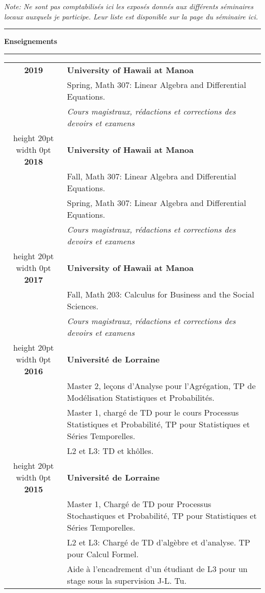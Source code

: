 \documentclass[a4paper,11pt]{article}
\newcommand\espace{\vrule height 20pt width 0pt}
\newcommand{\titre}[1]{%
	\begin{center}
	\bigskip
	\rule{\textwidth}{1pt}
	\par\vspace{0.1cm}
        \textbf{\large #1}
	\par\rule{\textwidth}{1pt}
	\end{center}
	\bigskip
	}
\begin{document}
\vfill
\textit{Note: Ne sont pas comptabilis\'es ici les expos\'es donn\'es aux diff\'erents s\'eminaires locaux auxquels je participe. Leur liste est disponible sur la page du s\'eminaire ici.}
\newpage
\titre{Enseignements}
\begin{tabular}{cp{}}

\textbf{ 2019 } 	& \textbf{University of Hawaii at Manoa}\\
					& Spring, Math 307: Linear Algebra and Differential Equations.\\
					& \textit{Cours magistraux, r\'edactions et corrections des devoirs et examens}\\
\espace
\textbf{ 2018 } 	& \textbf{University of Hawaii at Manoa}\\
					& Fall, Math 307: Linear Algebra and Differential Equations.\\
					& Spring, Math 307: Linear Algebra and Differential Equations.\\
					& \textit{Cours magistraux, r\'edactions et corrections des devoirs et examens}\\
\espace
\textbf{ 2017 } 	& \textbf{University of Hawaii at Manoa}\\
					& Fall, Math 203: Calculus for Business and the Social Sciences.\\
					& \textit{Cours magistraux, r\'edactions et corrections des devoirs et examens}\\
\espace
\textbf{ 2016 } 	& \textbf{Universit\'e de Lorraine}\\
					&	Master 2, le\c{c}ons d'Analyse pour l'Agrégation, TP de Mod\'elisation Statistiques et Probabilit\'es.\\
					&	Master 1,	charg\'e de TD pour le cours Processus Statistiques et Probabilit\'e, TP pour Statistiques et S\'eries Temporelles. \\
					&	L2 et L3: TD et kh\^{o}lles. \\
\espace
\textbf{ 2015 } 	& \textbf{Universit\'e de Lorraine}\\
			 		& Master 1, Charg\'e de TD pour Processus Stochastiques et Probabilit\'e, TP pour Statistiques et S\'eries Temporelles.\\
					& L2 et L3: Charg\'e de TD d'alg\`ebre et d'analyse. TP pour Calcul Formel.\\ 
					& Aide \`a l'encadrement d'un \'etudiant de L3 pour un stage sous la supervision J-L. Tu.\\   

\end{tabular}
\end{document}
